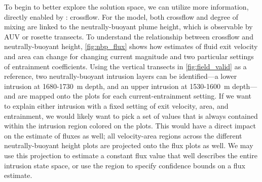 To begin to better explore the solution space, we can utilize more information, directly enabled by \PHUMES: crossflow. For the \PHUMES model, both crossflow and degree of mixing are linked to  the neutrally-buoyant plume height, which is observable by AUV or rosette transects. To understand the relationship between crossflow and neutrally-buoyant height, \cref{fig:nbp_flux} shows how estimates of fluid exit velocity and area can change for changing current magnitude and two particular settings of entrainment coefficients. Using the vertical transects in \cref{fig:field_valid} as a reference, two neutrally-buoyant intrusion layers can be identified---a lower intrusion at 1680-\SI{1730}{\meter} depth, and an upper intrusion at 1530-\SI{1600}{\meter} depth---and are mapped onto the plots for each current-entrainment setting. If we want to explain either intrusion with a fixed setting of exit velocity, area, and entrainment, we would likely want to pick a set of values that is always contained within the intrusion region colored on the plots. This would have a direct impact on the estimate of fluxes as well; all velocity-area regions across the different neutrally-buoyant height plots are projected onto the flux plots as well. We may use this projection to estimate a constant flux value that well describes the entire intrusion state space, or use the region to specify confidence bounds on a flux estimate.

